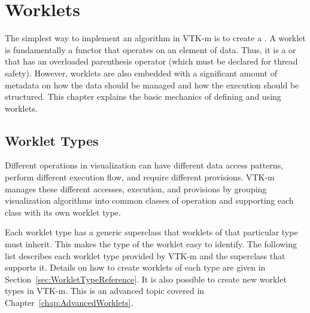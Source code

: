 
\chapter{Worklets}
\label{chap:Worklets}


The simplest way to implement an algorithm in VTK-m is to create a
. A worklet is fundamentally a functor that operates on an
element of data. Thus, it is a  or  that
has an overloaded parenthesis operator (which must be declared
 for thread safety). However, worklets are also embedded
with a significant amount of metadata on how the data should be managed and
how the execution should be structured. This chapter explains the basic
mechanics of defining and using worklets.


\section{Worklet Types}
\label{sec:WorkletTypes}


Different operations in visualization can have different data access
patterns, perform different execution flow, and require different
provisions. VTK-m manages these different accesses, execution, and
provisions by grouping visualization algorithms into common classes of
operation and supporting each class with its own worklet type.

Each worklet type has a generic superclass that worklets of that particular
type must inherit. This makes the type of the worklet easy to identify. The
following list describes each worklet type provided by VTK-m and the
superclass that supports it. Details on how to create worklets of each type
are given in Section~\ref{sec:WorkletTypeReference}. It is also possible
to create new worklet types in VTK-m. This is an advanced topic covered in
Chapter~\ref{chap:AdvancedWorklets}.

